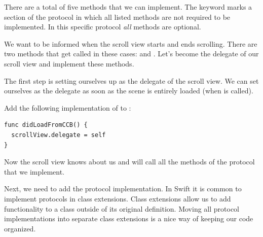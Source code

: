There are a total of five methods that we can implement. The
 keyword marks a section of the protocol in which all
listed methods are not required to be implemented. In this specific protocol \textit{all} methods are optional. 

We want to be informed when the scroll view starts and ends scrolling. There are
two methods that get called in these cases:
 and
. Let's become the delegate of our
scroll view and implement these methods.

The first step is setting ourselves up as the delegate of the scroll view. We
can set ourselves as the delegate as soon as the scene is entirely loaded (when
 is called). 
\begin{leftbar}
Add the following implementation of  to
:
\begin{lstlisting}
func didLoadFromCCB() {
  scrollView.delegate = self
}
\end{lstlisting}
\end{leftbar}
Now the scroll view knows about us and will call all the methods of the
 protocol that we implement.

Next, we need to add the protocol implementation. In Swift it is common to
implement protocols in class extensions. Class extensions allow us to add functionality to
a class outside of its original definition. Moving all protocol
implementations into separate class extensions is a nice way of keeping our code
organized. 


